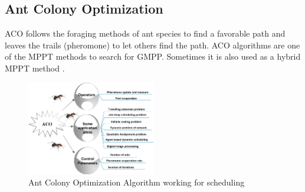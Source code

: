 \subsection{Ant Colony Optimization}
ACO follows the foraging methods of ant species to find a favorable path and leaves the trails (pheromone) to let others find the path. ACO algorithms are one of the MPPT methods to search for GMPP. Sometimes it is also used as a hybrid MPPT method \cite{mamur2022future}. 
\vspace{1em}

\begin{figure}[ht]
  \centering
  \includegraphics[width=0.5\textwidth]{ACO.png} 
  \caption{Ant Colony Optimization Algorithm working for scheduling \cite{rajan2015investigation}}
  \label{fig:image1}
\end{figure}

